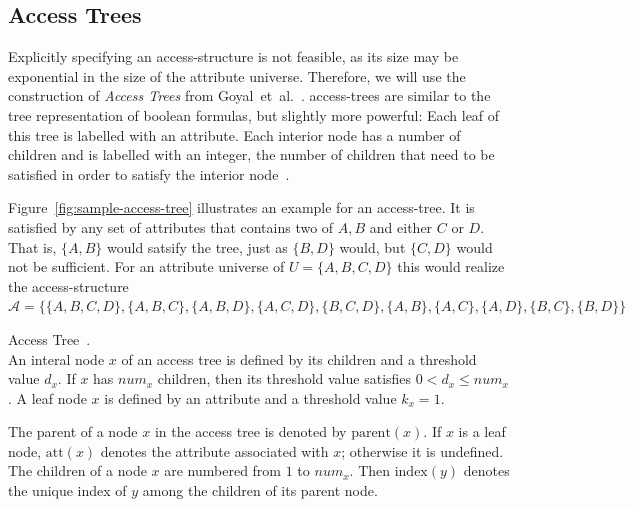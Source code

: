 \subsection{Access Trees}\label{sec:access-trees}



Explicitly specifying an \gls{access-structure} is not feasible, as its size may be exponential in the size of the attribute universe.
Therefore, we will use the construction of \emph{Access Trees} from Goyal~et~al.~\cite{goyal_attribute-based_2006}.
\Glspl{access-tree} are similar to the tree representation of boolean formulas, but slightly more powerful:
Each leaf of this tree is labelled with an attribute.
Each interior node has a number of children and is labelled with an integer, the number of children that need to be satisfied in order to satisfy the interior node~\cite{goyal_attribute-based_2006}.

Figure~\ref{fig:sample-access-tree} illustrates an example for an \gls{access-tree}. It is satisfied by any set of attributes that contains two of $A, B$ and either $C$ or $D$.
That is, $\{A,B\}$ would satsify the tree, just as $\{B, D\}$ would, but $\{C, D\}$ would not be sufficient.
For an attribute universe of $U = \{A, B, C, D\}$ this would realize the \gls{access-structure} $\mathcal{A} = \{\{A, B, C, D\}, \{A, B, C\}, \{A, B, D\},\{A, C, D\}, \{B, C, D\}, \{A, B\},\{A, C\},\{A,D\}, \{B, C\},\{B, D\}\}$

\begin{definition}
    Access Tree~\cite{goyal_attribute-based_2006}.\\
    An interal node $x$ of an access tree is defined by its children and a threshold value $d_x$.
    If $x$ has $num_x$ children, then its threshold value satisfies $0 < d_x \leq num_x$.
    A leaf node $x$ is defined by an attribute and a threshold value $k_x = 1$.

    The parent of a node $x$ in the access tree is denoted by $\text{parent}(x)$.
    If $x$ is a leaf node, $\text{att}(x)$ denotes the attribute associated with $x$; otherwise it is undefined.
    The children of a node $x$ are numbered from $1$ to $num_x$. Then $\text{index}(y)$ denotes the unique index of $y$ among the children of its parent node.
\end{definition}

